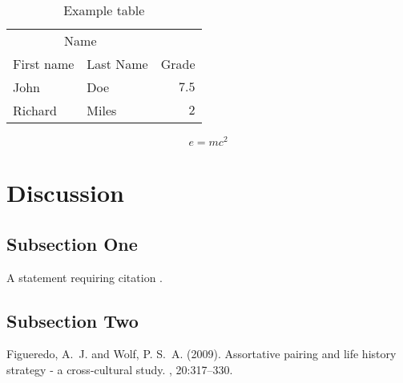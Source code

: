 \documentclass[twoside]{article}
\begin{document}
\begin{table}
\caption{Example table}
\centering
\begin{tabular}{llr}
\toprule
\multicolumn{2}{c}{Name} \\
\cmidrule(r){1-2}
First name & Last Name & Grade \\
\midrule
John & Doe & $7.5$ \\
Richard & Miles & $2$ \\
\bottomrule
\end{tabular}
\end{table}

\blindtext %

\begin{equation}
\label{eq:emc}
e = mc^2
\end{equation}

\blindtext %


\section{Discussion}

\subsection{Subsection One}

A statement requiring citation \cite{Figueredo:2009dg}.
\blindtext %

\subsection{Subsection Two}

\blindtext %


\begin{thebibliography}{99} %

Figueredo, A.~J. and Wolf, P. S.~A. (2009).
\newblock Assortative pairing and life history strategy - a cross-cultural
  study.
, 20:317--330.
 
\end{thebibliography}

\end{document}
